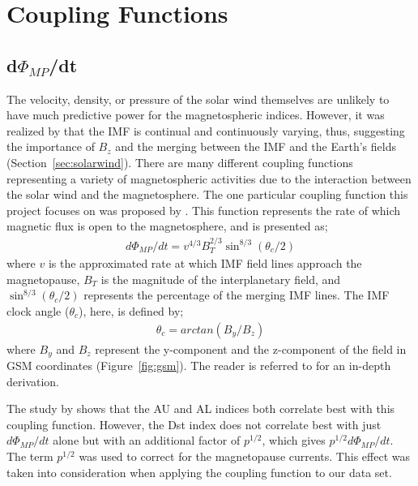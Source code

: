 \documentclass[12pt]{report} %
\begin{document}
\section{Coupling Functions} \label{sec:couplingfunctions}
\vspace{-5pt}
\subsection {d$\Phi_{MP}$/dt}\label{sec:dphi}
\vspace{-5pt}
The velocity, density, or pressure of the solar wind themselves are unlikely to have much predictive power for the magnetospheric indices. However, it was realized by \cite{dun61} that the IMF is continual and continuously varying, thus, suggesting the importance of $B_z$ and the merging between the IMF and the Earth's fields (Section~\ref{sec:solarwind}). 
There are many different coupling functions representing a variety of magnetospheric activities due to the interaction between the solar wind and the magnetosphere. The one particular  coupling function this project focuses on was proposed by \cite{newell07}. This function represents the rate of which magnetic flux is open to the magnetosphere, and is presented as;
\begin{align}
d\Phi_{MP}/dt = v^{4/3} B_{T}^{2/3} \sin^{8/3} (\theta_c/2) \label{eq:dphi}
\end{align}
\noindent where $v$ is the approximated rate at which IMF field lines approach the magnetopause, $B_T$ is the magnitude of the interplanetary field, and $\sin^{8/3} (\theta_c/2)$ represents the percentage of the merging IMF lines. The IMF clock angle ($\theta_c$), here, is defined by;
\begin{align}
\theta_c = arctan (B_y/B_z) \label{eq:thetac}
\end{align} 
\noindent where $B_y$ and $B_z$ represent the y-component and the z-component of the field in GSM coordinates (Figure~\ref{fig:gsm}). The reader is referred to \cite{newell07} for an in-depth derivation.

The study by \cite{newell07} shows that the AU and AL indices both correlate best with this coupling function. However, the Dst index does not correlate best with just $d\Phi_{MP}/dt$ alone but with an additional factor of $p^{1/2}$, which gives $p^{1/2}d\Phi_{MP}/dt$. The term $p^{1/2}$ was used to correct for the magnetopause currents. This effect was taken into consideration when applying the coupling function to our data set. 
\end{document}
